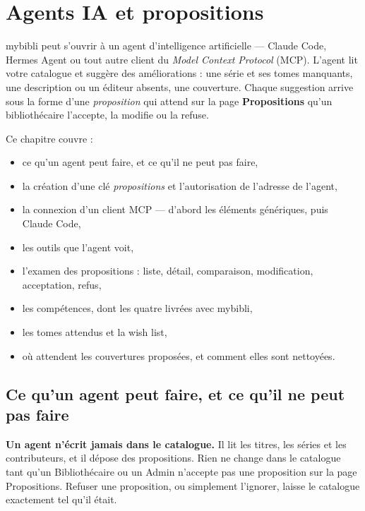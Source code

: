 \chapter{Agents IA et propositions}
\label{ch:agents}

mybibli peut s'ouvrir à un agent d'intelligence artificielle ---
Claude Code, Hermes Agent ou tout autre client du \emph{Model Context
Protocol} (MCP). L'agent lit
votre catalogue et suggère des améliorations : une série et ses tomes
manquants, une description ou un éditeur absents, une couverture.
Chaque suggestion arrive sous la forme d'une
\emph{proposition} qui attend sur la page
\textbf{Propositions} qu'un bibliothécaire l'accepte, la modifie ou
la refuse.

Ce chapitre couvre :

\begin{itemize}
  \item ce qu'un agent peut faire, et ce qu'il ne peut pas faire,
  \item la création d'une clé \emph{propositions} et l'autorisation
        de l'adresse de l'agent,
  \item la connexion d'un client MCP --- d'abord les éléments
        génériques, puis Claude Code,
  \item les outils que l'agent voit,
  \item l'examen des propositions : liste, détail, comparaison,
        modification, acceptation, refus,
  \item les compétences, dont les quatre livrées avec mybibli,
  \item les tomes attendus et la wish list,
  \item où attendent les couvertures proposées, et comment elles
        sont nettoyées.
\end{itemize}

\section{Ce qu'un agent peut faire, et ce qu'il ne peut pas faire}
\label{sec:agents-scope}

\begin{note}
\textbf{Un agent n'écrit jamais dans le catalogue.} Il lit les
titres, les séries et les contributeurs, et il dépose des
propositions. Rien ne change dans le catalogue tant qu'un
Bibliothécaire ou un Admin n'accepte pas une proposition sur la page
Propositions. Refuser une proposition, ou simplement l'ignorer, laisse
le catalogue exactement tel qu'il était.
\end{note}

